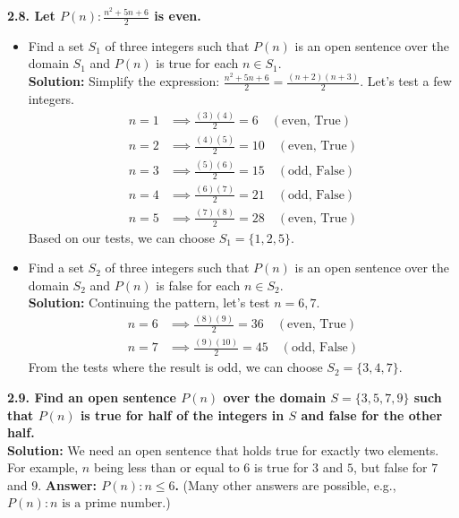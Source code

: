 \documentclass[11pt]{article}
\begin{document}
\vspace{0.5cm}
\textbf{2.8. Let $P(n): \frac{n^2+5n+6}{2}$ is even.}
\begin{itemize}
    \item[(a)] Find a set $S_1$ of three integers such that $P(n)$ is an open sentence over the domain $S_1$ and $P(n)$ is true for each $n \in S_1$. \\
    \textbf{Solution:} Simplify the expression: $\frac{n^2+5n+6}{2} = \frac{(n+2)(n+3)}{2}$. Let's test a few integers.
    \begin{align*}
        n=1 &\implies \frac{(3)(4)}{2} = 6 \quad (\text{even, True}) \\
        n=2 &\implies \frac{(4)(5)}{2} = 10 \quad (\text{even, True}) \\
        n=3 &\implies \frac{(5)(6)}{2} = 15 \quad (\text{odd, False}) \\
        n=4 &\implies \frac{(6)(7)}{2} = 21 \quad (\text{odd, False}) \\
        n=5 &\implies \frac{(7)(8)}{2} = 28 \quad (\text{even, True})
    \end{align*}
    Based on our tests, we can choose \textbf{$S_1 = \{1, 2, 5\}$}.
    
    \item[(b)] Find a set $S_2$ of three integers such that $P(n)$ is an open sentence over the domain $S_2$ and $P(n)$ is false for each $n \in S_2$. \\
    \textbf{Solution:} Continuing the pattern, let's test $n=6, 7$.
    \begin{align*}
        n=6 &\implies \frac{(8)(9)}{2} = 36 \quad (\text{even, True}) \\
        n=7 &\implies \frac{(9)(10)}{2} = 45 \quad (\text{odd, False})
    \end{align*}
    From the tests where the result is odd, we can choose \textbf{$S_2 = \{3, 4, 7\}$}.
\end{itemize}

\vspace{0.5cm}
\textbf{2.9. Find an open sentence $P(n)$ over the domain $S = \{3, 5, 7, 9\}$ such that $P(n)$ is true for half of the integers in $S$ and false for the other half.} \\
\textbf{Solution:} We need an open sentence that holds true for exactly two elements. For example, $n$ being less than or equal to $6$ is true for $3$ and $5$, but false for $7$ and $9$. 
\textbf{Answer: $P(n): n \le 6$.} (Many other answers are possible, e.g., $P(n): n \text{ is a prime number.}$)
\end{document}
